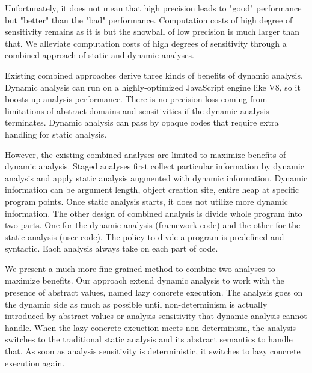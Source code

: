 Unfortunately, it does not mean that high precision leads to "good" performance
but "better" than the "bad" performance.
Computation costs of high degree of sensitivity remains as it is but the
snowball of low precision is much larger than that.
We alleviate computation costs of high degrees of sensitivity through a combined
approach of static and dynamic analyses.


Existing combined approaches derive three kinds of benefits of dynamic analysis.
Dynamic analysis can run on a highly-optimized JavaScript engine like V8, so
it boosts up analysis performance.
There is no precision loss coming from limitations of abstract domains and
sensitivities if the dynamic analysis terminates.
Dynamic analysis can pass by opaque codes that require extra handling for static
analysis.

However, the existing combined analyses are limited to maximize benefits of
dynamic analysis.
Staged analyses first collect particular information by dynamic analysis and
apply static analysis augmented with dynamic information.
Dynamic information can be argument length, object creation site, entire heap at
specific program points.
Once static analysis starts, it does not utilize more dynamic information.
The other design of combined analysis is divide whole program into two parts.
One for the dynamic analysis (framework code) and the other for the static analysis (user code).
The policy to divde a program is predefined and syntactic.
Each analysis always take on each part of code.

We present a much more fine-grained method to combine two analyses to maximize
benefits.
Our approach extend dynamic analysis to work with the presence of abstract
values, named lazy concrete execution.
The analysis goes on the dynamic side as much as possible until non-determinism
is actually introduced by abstract values or analysis sensitivity that dynamic
analysis cannot handle.
When the lazy concrete exeuction meets non-determinism, the analysis switches to
the traditional static analysis and its abstract semantics to handle that.
As soon as analysis sensitivity is deterministic, it switches to lazy concrete
execution again.

